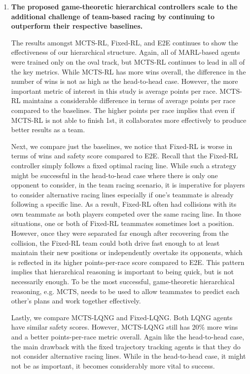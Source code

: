 \begin{enumerate}[wide, labelindent=0pt, font=\bfseries]
\item \textbf{The proposed game-theoretic hierarchical controllers scale to the additional challenge of team-based racing by continuing to outperform their respective baselines.} 

The results amongst MCTS-RL, Fixed-RL, and E2E continues to show the effectiveness of our hierarchical structure. Again, all of MARL-based agents were trained only on the oval track, but MCTS-RL continues to lead in all of the key metrics. While MCTS-RL has more wins overall, the difference in the number of wins is not as high as the head-to-head case. However, the more important metric of interest in this study is average points per race. MCTS-RL maintains a considerable difference in terms of average points per race compared to the baselines. The higher points per race implies that even if MCTS-RL is not able to finish 1st, it collaborates more effectively to produce better results as a team. 

Next, we compare just the baselines, we notice that Fixed-RL is worse in terms of wins and safety score compared to E2E. Recall that the Fixed-RL controller simply follows a fixed optimal racing line. While such a strategy might be successful in the head-to-head case where there is only one opponent to consider, in the team racing scenario, it is imperative for players to consider alternative racing lines especially if one's teammate is already following a specific line. As a result, Fixed-RL often had collisions with its own teammate as both players competed over the same racing line. In those situations, one or both of Fixed-RL teammates sometimes lost a position. However, once they were separated far enough after recovering from the collision, the Fixed-RL team could both drive fast enough to at least maintain their new positions or independently overtake its opponents, which is reflected in its higher points-per-race score compared to E2E. This pattern implies that hierarchical reasoning is important to being quick, but is not necessarily enough. To be the most successful, game-theoretic hierarchical reasoning, e.g. MCTS, needs to be used to allow teammates to predict each other's plans and work together effectively. 

Lastly, we compare MCTS-LQNG and Fixed-LQNG. Both LQNG agents have similar safety scores. However, MCTS-LQNG still has 20\% more wins and a better points-per-race metric overall. Again like the head-to-head case, the main drawback with the fixed trajectory tracking agents is that they do not consider alternative racing lines. While in the head-to-head case, it might not be as important, it becomes considerably more vital to success. 


\end{enumerate}
